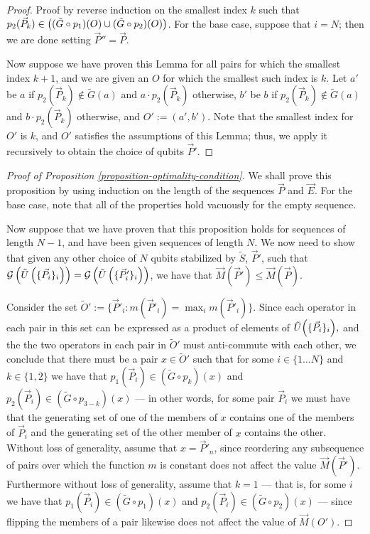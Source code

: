 \documentclass[twocolumn,showpacs,preprintnumbers,amsmath,amssymb,nofootinbib,pra,floatfix]{revtex4-1}
\newcommand{\lst}{\vec}
\newcommand{\set}{\tilde}
\newcommand{\genfun}{\mathcal{G}}
\begin{document}
\begin{proof}
Proof by reverse induction on the smallest index $k$ such that $p_2(\lst P_k)\in\paren{(\set G\circ p_1)(O)\cup (\set G\circ p_2)(O)}$.  For the base case, suppose that $i=N$; then we are done setting $\lst P''=\lst P$.

Now suppose we have proven this Lemma for all pairs for which the smallest index $k+1$, and we are given an $O$ for which the smallest such index is $k$.  Let $a'$ be $a$ if $p_2(\lst P_k)\notin\set G(a)$ and $a\cdot p_2(\lst P_k)$ otherwise, $b'$ be $b$ if $p_2(\lst P_k)\notin\set G(a)$ and $b\cdot p_2(\lst P_k)$ otherwise, and $O':=(a',b')$.  Note that the smallest index for $O'$ is $k$, and $O'$ satisfies the assumptions of this Lemma;  thus, we apply it recursively to obtain the choice of qubits $\lst P'$.
\end{proof}
\begin{proof}[Proof of Proposition \ref{proposition-optimality-condition}]
We shall prove this proposition by using induction on the length of the sequences $\lst P$ and $\lst E$.  For the base case, note that all of the properties hold vacuously for the empty sequence.

Now suppose that we have proven that this proposition holds for sequences of length $N-1$, and have been given sequences of length $N$.  We now need to show that given any other choice of $N$ qubits stabilized by $\set S$, $\lst P'$, such that $\genfun\paren{\set U\paren{\{\lst P_i\}_i}}=\genfun\paren{\set U\paren{\{\lst P'_i\}_i}}$, we have that $\lst M(\lst P') \le \lst M(\lst P)$.

Consider the set $\set O' := \{\lst P'_i:m(\lst P'_i)=\max_i m(\lst P'_i) \}$.  Since each operator in each pair in this set can be expressed as a product of elements of $\set U{\paren{\{\lst P_i\}_i}},$ and the the two operators in each pair in $\set O'$ must anti-commute with each other, we conclude that there must be a pair $x\in\set O'$ such that for some $i\in\{1\dots N\}$ and $k\in \{1,2\}$ we have that $p_1(\lst P_i)\in (\set G \circ p_k)(x)$ and $p_2(\lst P_i)\in (\set G \circ p_{3-k})(x)$ --- in other words, for some pair $\lst P_i$ we must have that the generating set of one of the members of $x$ contains one of the members of $\lst P_i$ and the generating set of the other member of $x$ contains the other.  Without loss of generality, assume that $x=\lst P'_n$, since reordering any subsequence of pairs over which the function $m$ is constant does not affect the value $\lst M(\lst P')$.  Furthermore without loss of generality, assume that $k=1$ --- that is, for some $i$ we have that $p_1(\lst P_i)\in(\set G \circ p_1)(x)$ and $p_2(\lst P_i)\in(\set G \circ p_2)(x)$ --- since flipping the members of a pair likewise does not affect the value of $\lst M(O')$.

\end{proof}
\end{document}
